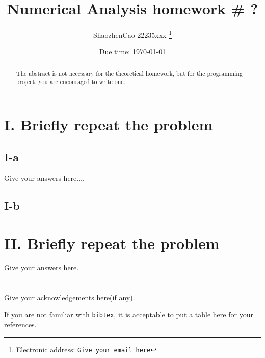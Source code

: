 \documentclass[a4paper]{article}
\begin{document}
\title{Numerical Analysis homework \# ?}

\author{ShaozhenCao 22235xxx
  \thanks{Electronic address: \texttt{Give your email here}}}


\date{Due time: \today}

\maketitle

\begin{abstract}
    The abstract is not necessary for the theoretical homework, 
    but for the programming project, 
    you are encouraged to write one.      
\end{abstract}





\section*{I. Briefly repeat the problem}

\subsection*{I-a}

Give your answers here....\cite{Zhang2020BooleanAO}

\subsection*{I-b}

\section*{II. Briefly repeat the problem}

Give your answers here.





\section*{  }
Give your acknowledgements here(if any).


\printbibliography

If you are not familiar with \texttt{bibtex}, 
it is acceptable to put a table here for your references.
\end{document}
